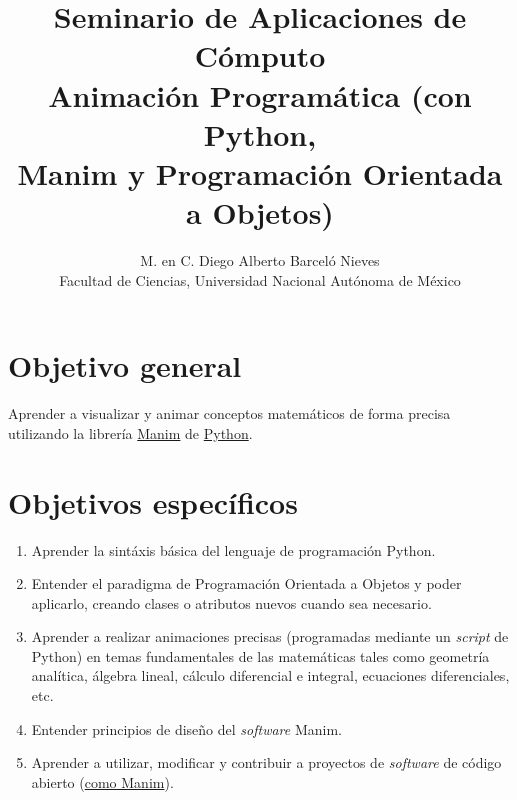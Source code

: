 \documentclass[a4paper]{article}
\begin{document}
\title{Seminario de Aplicaciones de Cómputo \\ Animación Programática (con Python, \\ Manim y Programación Orientada a Objetos) }
\author{M. en C. Diego Alberto Barceló Nieves \\ Facultad de Ciencias, Universidad Nacional Autónoma de México}
\date{}
\maketitle

\section*{Objetivo general} \label{Sec: Objetivo general}

Aprender a visualizar y animar conceptos matemáticos de forma precisa utilizando la librería \hyperlink{https://www.manim.community/}{Manim} de \hyperlink{https://www.python.org/}{Python}.

\section*{Objetivos específicos} \label{Sec: Objetivos específicos}

\begin{enumerate}

    \item Aprender la sintáxis básica del lenguaje de programación Python.

    \item Entender el paradigma de Programación Orientada a Objetos y poder aplicarlo, creando clases o atributos nuevos cuando sea necesario.

    \item Aprender a realizar animaciones precisas (programadas mediante un \emph{script} de Python) en temas fundamentales de las matemáticas tales como geometría analítica, álgebra lineal, cálculo diferencial e integral, ecuaciones diferenciales, etc.

    \item Entender principios de diseño del \emph{software} Manim.

    \item Aprender a utilizar, modificar y contribuir a proyectos de \emph{software} de código abierto (\hyperlink{https://github.com/ManimCommunity/manim}{como Manim}).
\end{enumerate}
\end{document}
